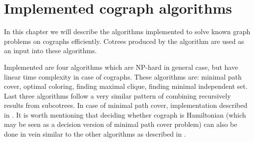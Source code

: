 
\chapter{Implemented cograph algorithms}\label{r:algos}

In this chapter we will describe the algorithms implemented to solve known graph problems on cographs efficiently. Cotrees produced by the \cite{corneil} algorithm are used as an input into these algorithms.

Implemented are four algorithms which are NP-hard in general case, but have linear time complexity in case of cographs. These algorithms are: minimal path cover, optimal coloring, finding maximal clique, finding minimal independent set. Last three algorithms follow a very similar pattern of combining recursively results from subcotrees. In case of minimal path cover, implementation described in \cite{olariu}. It is worth mentioning that deciding whether cograph is Hamiltonian (which may be seen as a decision version of minimal path cover problem) can also be done in vein similar to the other algorithms as described in \cite{corneil2}.




